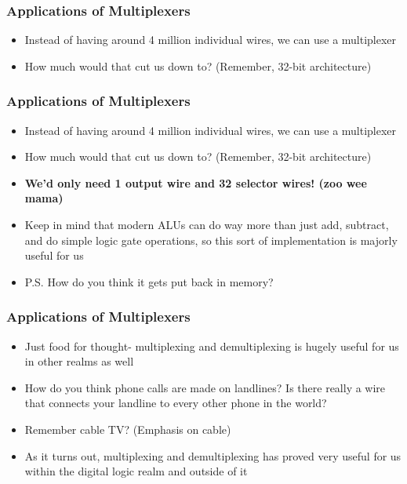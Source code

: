 \documentclass{beamer}
\begin{document}
             \begin{frame}
             	\frametitle{Applications of Multiplexers}
             	\begin{itemize}
             		\item Instead of having around 4 million individual wires, we can use a multiplexer
             		\item How much would that cut us down to? (Remember, 32-bit architecture)
             	\end{itemize}
             \end{frame}
             
             
             \begin{frame}
             	\frametitle{Applications of Multiplexers}
             	\begin{itemize}
             		\item Instead of having around 4 million individual wires, we can use a multiplexer
             		\item How much would that cut us down to? (Remember, 32-bit architecture)
             		\item \textbf{We'd only need 1 output wire and 32 selector wires! (zoo wee mama)}
             		\item Keep in mind that modern ALUs can do way more than just add, subtract, and do simple logic gate operations, so this sort of implementation is majorly useful for us
             		\item P.S. How do you think it gets put back in memory?
             	\end{itemize}
             \end{frame}
             
             
             \begin{frame}
             	\frametitle{Applications of Multiplexers}
             	\begin{itemize}
             		\item Just food for thought- multiplexing and demultiplexing is hugely useful for us in other realms as well
             		\item How do you think phone calls are made on landlines? Is there really a wire that connects your landline to every other phone in the world?
             		\item Remember cable TV? (Emphasis on cable)
             		\item As it turns out, multiplexing and demultiplexing has proved very useful for us within the digital logic realm and outside of it
             	\end{itemize}
             \end{frame}
             
\end{document}
